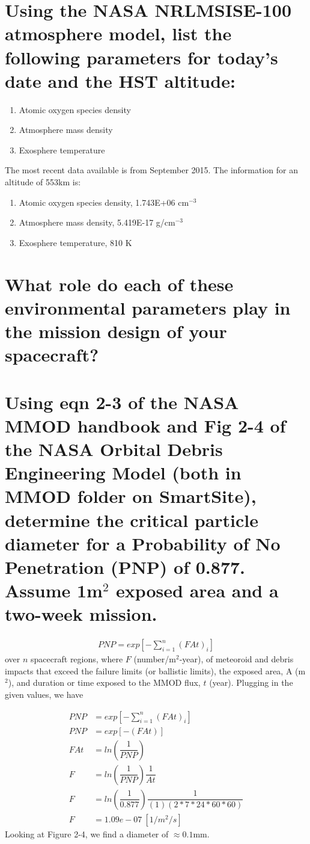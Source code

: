 \documentclass[onecolumn,10pt]{jhwhw}
\begin{document}
\part{Using the NASA NRLMSISE-100 atmosphere model, list the following parameters for today’s date and the HST altitude:}
\begin{enumerate}
\item Atomic oxygen species density
\item Atmosphere mass density
\item Exosphere temperature
\end{enumerate}
\vspace{1em}
The most recent data available is from September 2015. The information for an altitude of 553km is:
\begin{enumerate}
\item Atomic oxygen species density, 1.743E+06 cm$^{-3}$
\item Atmosphere mass density, 5.419E-17 g/cm$^{-3}$
\item Exosphere temperature, 810 K
\end{enumerate}

\part{What role do each of these environmental parameters play in the mission design of your spacecraft?
}

\part{Using eqn 2-3 of the NASA MMOD handbook and Fig 2-4 of the NASA Orbital Debris Engineering Model (both in MMOD folder on SmartSite), determine the critical particle diameter for a Probability of No Penetration (PNP) of 0.877. Assume 1m$^2$ exposed area and
a two-week mission.}

\begin{align*}
  PNP = exp\left[- \sum^{n}_{i=1} \left(F A t\right)_i \right]
\end{align*}
over $n$ spacecraft regions, where $F$ (number/m$^2$-year), of meteoroid and debris impacts that exceed the failure limits (or ballistic limits), the exposed area, A (m$^2$), and duration or time exposed to the MMOD flux, $t$ (year). Plugging in the given values, we have

\begin{align*}
  PNP &= exp\left[- \sum^{n}_{i=1} \left(F A t\right)_i \right] \\
  PNP &= exp\left[- (F A t) \right] \\
  FAt &= ln(\dfrac{1}{PNP})\\
F &= ln(\dfrac{1}{PNP}) \dfrac{1}{At}\\
F &= ln(\dfrac{1}{0.877}) \dfrac{1}{(1)(2*7*24*60*60)}\\
F &= 1.09e-07~[1/m^2/s]
\end{align*}
\noindent Looking at Figure 2-4, we find a diameter of $\approx 0.1$mm.
\end{document}
